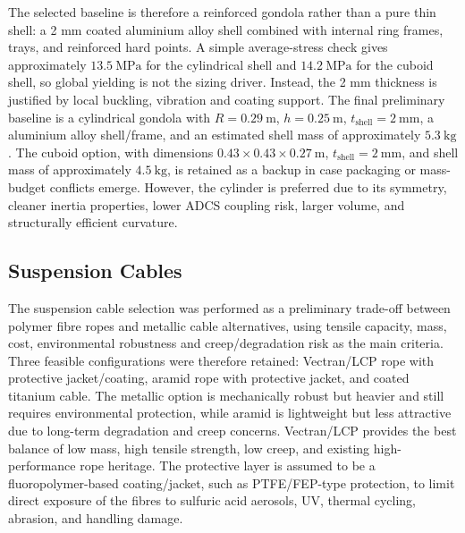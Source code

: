 The selected baseline is therefore a reinforced gondola rather than a pure thin shell: a 2 mm coated aluminium alloy shell combined with internal ring frames, trays, and reinforced hard points. A simple average-stress check gives approximately $13.5~\mathrm{MPa}$ for the cylindrical shell and $14.2~\mathrm{MPa}$ for the cuboid shell, so global yielding is not the sizing driver. Instead, the 2 mm thickness is justified by local buckling, vibration and coating support. The final preliminary baseline is a cylindrical gondola with $R = 0.29~\mathrm{m}$, $h = 0.25~\mathrm{m}$, $t_{\mathrm{shell}} = 2~\mathrm{mm}$, a aluminium alloy shell/frame, and an estimated shell mass of approximately $5.3~\mathrm{kg}$. The cuboid option, with dimensions $0.43 \times 0.43 \times 0.27~\mathrm{m}$, $t_{\mathrm{shell}} = 2~\mathrm{mm}$, and shell mass of approximately $4.5~\mathrm{kg}$, is retained as a backup in case packaging or mass-budget conflicts emerge. However, the cylinder is preferred due to its symmetry, cleaner inertia properties, lower ADCS coupling risk, larger volume, and structurally efficient curvature.

\subsection{Suspension Cables}
The suspension cable selection was performed as a preliminary trade-off between polymer fibre ropes and metallic cable alternatives, using tensile capacity, mass, cost, environmental robustness and creep/degradation risk as the main criteria.  Three feasible configurations were therefore retained: Vectran/LCP rope with protective jacket/coating, aramid rope with protective jacket, and coated titanium cable. The metallic option is mechanically robust but heavier and still requires environmental protection, while aramid is lightweight but less attractive due to long-term degradation and creep concerns. Vectran/LCP provides the best balance of low mass, high tensile strength, low creep, and existing high-performance rope heritage. The protective layer is assumed to be a fluoropolymer-based coating/jacket, such as PTFE/FEP-type protection, to limit direct exposure of the fibres to sulfuric acid aerosols, UV, thermal cycling, abrasion, and handling damage.

